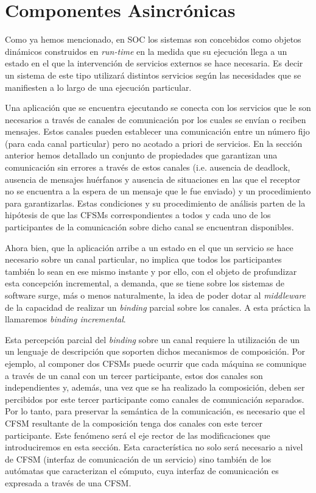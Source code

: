 

\chapter{Componentes Asincrónicas}
\label{AFCA}
Como ya hemos mencionado, en SOC los sistemas son concebidos como objetos dinámicos construidos en \emph{run-time} en la medida que su ejecución llega a un estado en el que la intervención de servicios externos se hace necesaria. Es decir un sistema de este tipo utilizará distintos servicios según las necesidades que se manifiesten a lo largo de una ejecución particular. 
 
Una aplicación que se encuentra ejecutando se conecta con los servicios que le son necesarios a través de canales de comunicación por los cuales se envían o reciben mensajes. Estos canales pueden establecer una comunicación entre un número fijo (para cada canal particular) pero no acotado a priori de servicios. En la sección anterior hemos detallado un conjunto de propiedades que garantizan una comunicación sin errores a través de estos canales (i.e. ausencia de deadlock, ausencia de mensajes huérfanos y ausencia de situaciones en las que el receptor no se encuentra a la espera de un mensaje que le fue enviado) y un procedimiento para garantizarlas. Estas condiciones y su procedimiento de análisis parten de la hipótesis de que las CFSMs correspondientes a todos y cada uno de los participantes de la comunicación sobre dicho canal se encuentran disponibles.

Ahora bien, que la aplicación arribe a un estado en el que un servicio se hace necesario sobre un canal particular, no implica que todos los participantes también lo sean en ese mismo instante y por ello, con el objeto de profundizar esta concepción incremental, a demanda, que se tiene sobre los sistemas de software surge, más o menos naturalmente, la idea de poder dotar al \emph{middleware} de la capacidad de realizar un \emph{binding} parcial sobre los canales. A esta práctica la llamaremos \emph{binding incremental}.
 
Esta percepción parcial del \emph{binding} sobre un canal requiere la utilización de un un lenguaje de descripción que soporten dichos mecanismos de composición. Por ejemplo, al componer dos CFSMs puede ocurrir que cada máquina se comunique a través de un canal con un tercer participante, estos dos canales son independientes y, además, una vez que se ha realizado la composición, deben ser percibidos por este tercer participante como canales de comunicación separados. Por lo tanto, para preservar la semántica de la comunicación, es necesario que el CFSM resultante de la composición tenga dos canales con este tercer participante. Este fenómeno será el eje rector de las modificaciones que introduciremos en esta sección. Esta característica no solo será necesario a nivel de CFSM (interfaz de comunicación de un servicio) sino también de los autómatas que caracterizan el cómputo, cuya interfaz de comunicación es expresada a través de una CFSM.


